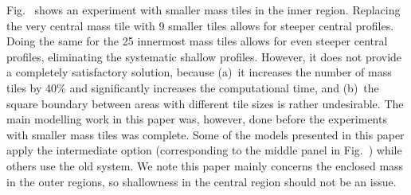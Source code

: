 Fig.~ shows an experiment with smaller mass
tiles in the inner region.  Replacing the very central mass tile with
9 smaller tiles allows for steeper central profiles.  Doing the same
for the 25 innermost mass tiles allows for even steeper central
profiles, eliminating the systematic shallow profiles.  However, 
it does not provide a completely satisfactory solution, because (a)~it increases
the number of mass tiles by 40\% and significantly increases the
computational time, and (b)~the square boundary between areas with
different tile sizes is rather undesirable.
The main modelling work in this paper was, however, done before the
experiments with smaller mass tiles was complete.  Some of the models
presented in this paper apply the intermediate option (corresponding
to the middle panel in Fig.~) while others use
the old system.  We note this paper mainly concerns the enclosed mass
in the outer regions, so shallowness in the central region should not be
an issue.

